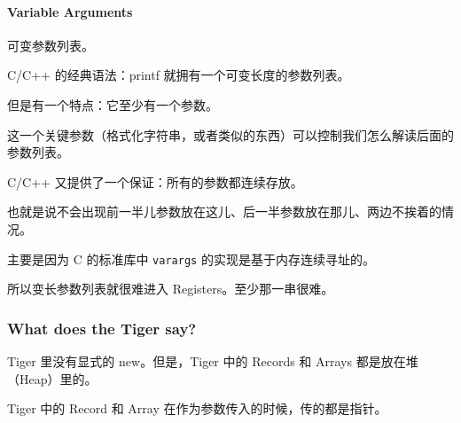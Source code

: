 \documentclass[
]{article}
\begin{document}
\hypertarget{header-n248}{%
\paragraph{Variable Arguments}\label{header-n248}}

可变参数列表。

C/C++ 的经典语法：printf 就拥有一个可变长度的参数列表。

但是有一个特点：它至少有一个参数。

这一个关键参数（格式化字符串，或者类似的东西）可以控制我们怎么解读后面的参数列表。

C/C++ 又提供了一个保证：所有的参数都连续存放。

也就是说不会出现前一半儿参数放在这儿、后一半参数放在那儿、两边不挨着的情况。

主要是因为 C 的标准库中 \texttt{varargs} 的实现是基于内存连续寻址的。

所以变长参数列表就很难进入 Registers。至少那一串很难。

\hypertarget{header-n257}{%
\subsubsection{What does the Tiger say?}\label{header-n257}}

Tiger 里没有显式的 new。但是，Tiger 中的 Records 和 Arrays
都是放在堆（Heap）里的。

Tiger 中的 Record 和 Array 在作为参数传入的时候，传的都是指针。
\end{document}
